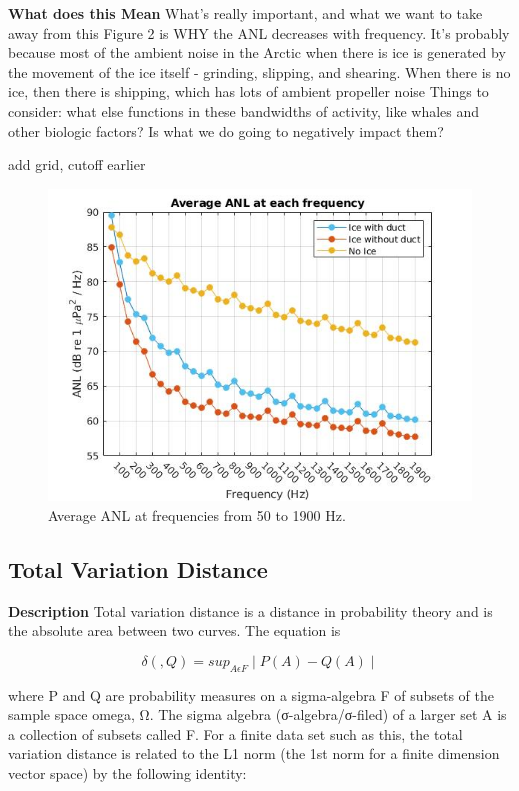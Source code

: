 \textbf{What does this Mean}
What’s really important, and what we want to take away from this Figure 2 is WHY the ANL decreases with frequency. It’s probably because most of the ambient noise in the Arctic when there is ice is generated by the movement of the ice itself - grinding, slipping, and shearing. When there is no ice, then there is shipping, which has lots of ambient propeller noise
Things to consider: what else functions in these bandwidths of activity, like whales and other biologic factors? Is what we do going to negatively impact them?

add grid, cutoff earlier

\begin{figure}[h]
\centering
\includegraphics[scale=0.5]{Figures/Average_ANL_cutoff.jpg}
\caption{Average ANL at frequencies from 50 to 1900 Hz.}
\label{fig_avg_anl}
\end{figure}

\subsection{Total Variation Distance}
\textbf{Description}
Total variation distance is a distance in probability theory and is the absolute area between two curves. The equation is 

\begin{equation} \label{totalvardist}
\delta(,Q)=sup_{A\epsilon F}\mid P(A)-Q(A)\mid   
\end{equation}

where P and Q are probability measures on a sigma-algebra F of subsets of the sample space omega, Ω. The sigma algebra (σ-algebra/σ-filed) of a larger set A is a collection of subsets called F. For a finite data set such as this, the total variation distance is related to the L1 norm (the 1st norm for a finite dimension vector space) by the following identity:

